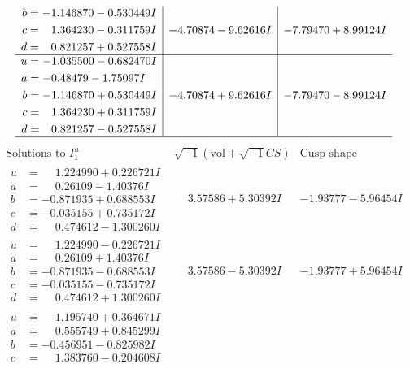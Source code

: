 \documentclass[1p]{elsarticle_modified}
\theoremstyle{definition}
\newcommand{\I}{\sqrt{-1}}
\begin{document}
$$\begin{array}{c|c|c}
\begin{aligned}
b &= -1.146870 - 0.530449 I \\
c &= \phantom{-}1.364230 - 0.311759 I \\
d &= \phantom{-}0.821257 + 0.527558 I\end{aligned}
 & -4.70874 - 9.62616 I & -7.79470 + 8.99124 I \\ \hline\begin{aligned}
u &= -1.035500 - 0.682470 I \\
a &= -0.48479 - 1.75097 I \\
b &= -1.146870 + 0.530449 I \\
c &= \phantom{-}1.364230 + 0.311759 I \\
d &= \phantom{-}0.821257 - 0.527558 I\end{aligned}
 & -4.70874 + 9.62616 I & -7.79470 - 8.99124 I\\
 \hline 
 \end{array}$$\newpage$$\begin{array}{c|c|c}  
\text{Solutions to }I^u_{1}& \I (\text{vol} + \sqrt{-1}CS) & \text{Cusp shape}\\
 \hline 
\begin{aligned}
u &= \phantom{-}1.224990 + 0.226721 I \\
a &= \phantom{-}0.26109 - 1.40376 I \\
b &= -0.871935 + 0.688553 I \\
c &= -0.035155 + 0.735172 I \\
d &= \phantom{-}0.474612 - 1.300260 I\end{aligned}
 & \phantom{-}3.57586 + 5.30392 I & -1.93777 - 5.96454 I \\ \hline\begin{aligned}
u &= \phantom{-}1.224990 - 0.226721 I \\
a &= \phantom{-}0.26109 + 1.40376 I \\
b &= -0.871935 - 0.688553 I \\
c &= -0.035155 - 0.735172 I \\
d &= \phantom{-}0.474612 + 1.300260 I\end{aligned}
 & \phantom{-}3.57586 - 5.30392 I & -1.93777 + 5.96454 I \\ \hline\begin{aligned}
u &= \phantom{-}1.195740 + 0.364671 I \\
a &= \phantom{-}0.555749 + 0.845299 I \\
b &= -0.456951 - 0.825982 I \\
c &= \phantom{-}1.383760 - 0.204608 I \\

\end{aligned}
\end{array}$$
\end{document}
